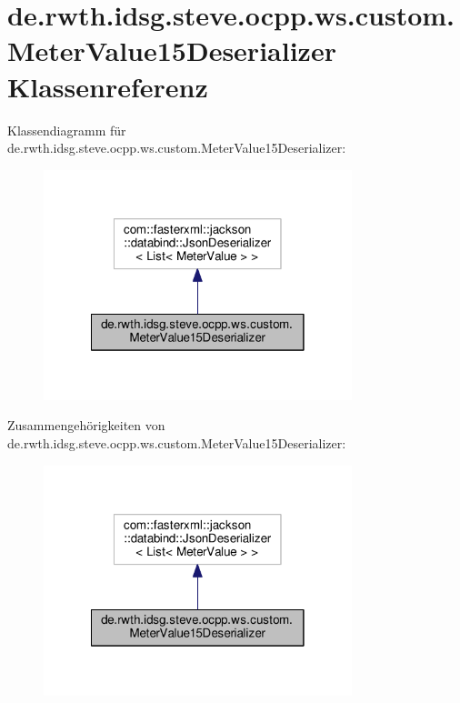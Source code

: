 \hypertarget{classde_1_1rwth_1_1idsg_1_1steve_1_1ocpp_1_1ws_1_1custom_1_1_meter_value15_deserializer}{\section{de.\-rwth.\-idsg.\-steve.\-ocpp.\-ws.\-custom.\-Meter\-Value15\-Deserializer Klassenreferenz}
\label{classde_1_1rwth_1_1idsg_1_1steve_1_1ocpp_1_1ws_1_1custom_1_1_meter_value15_deserializer}
}


Klassendiagramm für de.\-rwth.\-idsg.\-steve.\-ocpp.\-ws.\-custom.\-Meter\-Value15\-Deserializer\-:\nopagebreak
\begin{figure}[H]
\begin{center}
\leavevmode
\includegraphics[width=254pt]{classde_1_1rwth_1_1idsg_1_1steve_1_1ocpp_1_1ws_1_1custom_1_1_meter_value15_deserializer__inherit__graph}
\end{center}
\end{figure}


Zusammengehörigkeiten von de.\-rwth.\-idsg.\-steve.\-ocpp.\-ws.\-custom.\-Meter\-Value15\-Deserializer\-:\nopagebreak
\begin{figure}[H]
\begin{center}
\leavevmode
\includegraphics[width=254pt]{classde_1_1rwth_1_1idsg_1_1steve_1_1ocpp_1_1ws_1_1custom_1_1_meter_value15_deserializer__coll__graph}
\end{center}
\end{figure}
